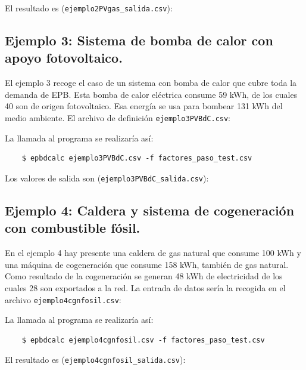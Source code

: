 \documentclass[10pt,notitlepage,oneside,a4paper]{article}
\begin{document}
El resultado es (\texttt{ejemplo2PVgas\_salida.csv}):


\subsection{Ejemplo 3: Sistema de bomba de calor con apoyo fotovoltaico.}
El ejemplo 3 recoge el caso de un sistema con bomba de calor que cubre toda la demanda de EPB. Esta bomba de calor eléctrica consume 59 kWh, de los cuales 40 son de origen fotovoltaico. Esa energía se usa para bombear 131 kWh del medio ambiente. El archivo de definición \texttt{ejemplo3PVBdC.csv}:


La llamada al programa se realizaría así:

\begin{verbatim}
    $ epbdcalc ejemplo3PVBdC.csv -f factores_paso_test.csv
\end{verbatim}

Los valores de salida son (\texttt{ejemplo3PVBdC\_salida.csv}):


\subsection{Ejemplo 4: Caldera y sistema de cogeneración con combustible fósil.}
En el ejemplo 4 hay presente una caldera de gas natural que consume 100 kWh y una máquina de cogeneración que consume 158 kWh, también de gas natural. Como resultado de la cogeneración se generan 48 kWh de electricidad de los cuales 28 son exportados a la red. La entrada de datos sería la recogida en el archivo \texttt{ejemplo4cgnfosil.csv}:


La llamada al programa se realizaría así:

\begin{verbatim}
    $ epbdcalc ejemplo4cgnfosil.csv -f factores_paso_test.csv
\end{verbatim}

El resultado es (\texttt{ejemplo4cgnfosil\_salida.csv}):
\end{document}
